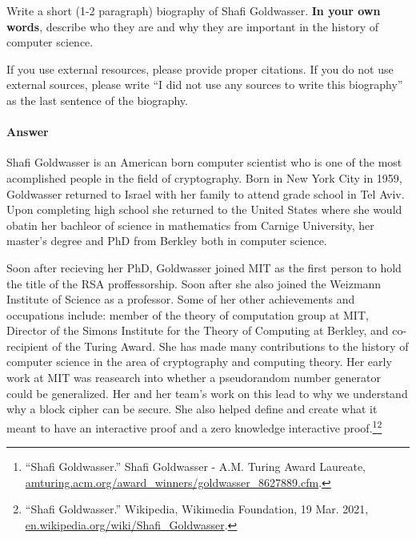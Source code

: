 \documentclass{article}
\begin{document}

Write a short (1-2 paragraph) biography of Shafi Goldwasser.
\textbf{In your own words}, describe who they are and why they are important in
the history of computer science.

If you use external resources, please provide
proper citations. If you do not use external sources, please write ``I did not
use any sources to write this biography'' as the last sentence of the
biography.

\paragraph{Answer}

	Shafi Goldwasser is an American born computer scientist who is one of the most acomplished people in the field of cryptography. Born in New York City in 1959, Goldwasser returned to Israel with her family to attend grade school in Tel Aviv. Upon completing high school she returned to the United States where she would obatin her bachleor of science in mathematics from Carnige University, her master's degree and PhD from Berkley both in computer science.

	Soon after recieving her PhD, Goldwasser joined MIT as the first person to hold the title of the RSA proffessorship. Soon after she also joined the Weizmann Institute of Science as a professor. Some of her other achievements and occupations include: member of the theory of computation group at MIT, Director of the Simons Institute for the Theory of Computing at Berkley, and co-recipient of the Turing Award. She has made many contributions to the history of computer science in the area of cryptography and computing theory. Her early work at MIT was reasearch into whether a pseudorandom number generator could be generalized. Her and her team's work on this lead to why we understand why a block cipher can be secure. She also helped define and create what it meant to have an interactive proof and a zero knowledge interactive proof.\footnote{“Shafi Goldwasser.” Shafi Goldwasser - A.M. Turing Award Laureate, \url{amturing.acm.org/award_winners/goldwasser_8627889.cfm}. }\footnote{“Shafi Goldwasser.” Wikipedia, Wikimedia Foundation, 19 Mar. 2021, \url{en.wikipedia.org/wiki/Shafi_Goldwasser}. }

% 
% 
\end{document}
